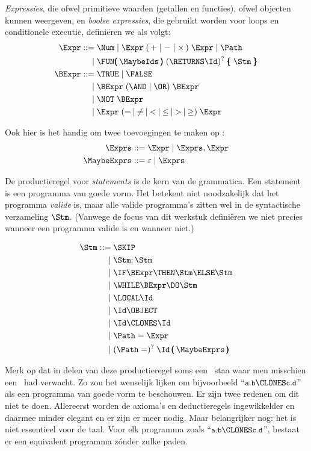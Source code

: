 \emph{Expressies}, die ofwel primitieve waarden (getallen en functies), ofwel objecten kunnen weergeven, en \emph{boolse expressies}, die gebruikt worden voor loops en conditionele executie, definiëren we als volgt:
%
\begin{align*}
  \Expr       \GDef \Num \mid \Expr\; (\,+ \mid - \mid \times \,)\; \Expr \mid \Path
              \GAlt \FUN\pmb(\,\MaybeIds\,\pmb)\; (\RETURNS \Id)^?\; \pmb\{\; \Stm\; \pmb\} \\
  \BExpr      \GDef \TRUE \mid \FALSE
              \GAlt \BExpr\; (\AND \mid \OR)\; \BExpr
              \GAlt \NOT\; \BExpr
              \GAlt \Expr\; (=\: \mid\: \neq\: \mid\: <\: \mid\: \le\: \mid\: >\: \mid\: \ge)\; \Expr
\end{align*}

Ook hier is het handig om twee toevoegingen te maken op \Expr:
%
\begin{align*}
  \Exprs      \GDef \Expr \mid \Exprs, \Expr \\
  \MaybeExprs \GDef \varepsilon \mid \Exprs \\
\end{align*}

De productieregel voor \emph{statements} is de kern van de grammatica. Een statement is een programma van goede vorm. Het betekent niet noodzakelijk dat het programma \emph{valide} is, maar alle valide programma's zitten wel in de syntactische verzameling $\Stm$. (Vanwege de focus van dit werkstuk definiëren we niet precies wanneer een programma valide is en wanneer niet.)

\begin{align*}
  \Stm \GDef \SKIP
       \GAlt \Stm; \Stm
       \GAlt \IF \BExpr \THEN \Stm \ELSE \Stm
       \GAlt \WHILE \BExpr \DO \Stm
       \GAlt \LOCAL \Id
       \GAlt \Id \OBJECT
       \GAlt \Id \CLONES \Id
       \GAlt \Path = \Expr
       \GAlt (\Path =)^?\; \Id\,\pmb(\,\MaybeExprs\,\pmb)
\end{align*}

Merk op dat in delen van deze productieregel soms een \Id\ staa  waar men misschien een \Path\ had verwacht. Zo zou het wenselijk lijken om bijvoorbeeld “$\id{a}.\id{b} \CLONES \id{c}.\id{d}$” als een programma van goede vorm te beschouwen. Er zijn twee redenen om dit niet te doen. Allereerst worden de axioma's en deductieregels ingewikkelder en daarmee minder elegant en er zijn er meer nodig. Maar belangrijker nog: het is niet essentieel voor de taal. Voor elk programma zoals “$\id{a}.\id{b} \CLONES \id{c}.\id{d}$”, bestaat er een equivalent programma zónder zulke paden.

